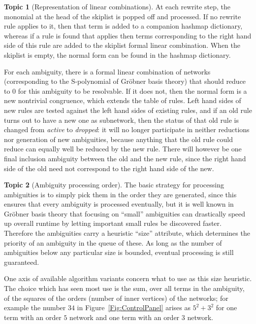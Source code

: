 \documentclass{article}
\theoremstyle{definition}
\newtheorem{topic}{Topic}
\begin{document}
\begin{topic}[Representation of linear combinations]
  At each rewrite step, the monomial at the head of the skiplist is 
  popped off and processed. If no rewrite rule applies to it, then 
  that term is added to a companion hashmap dictionary, whereas if a 
  rule is found that applies then terms corresponding to the right 
  hand side of this rule are added to the skiplist formal linear 
  combination. When the skiplist is empty, the normal form can be 
  found in the hashmap dictionary.
\end{topic}

For each ambiguity, there is a formal linear combination of networks 
(corresponding to the S-polynomial of Gr\"obner basis theory) that 
should reduce to $0$ for this ambiguity to be resolvable. If it does 
not, then the normal form is a new nontrivial congruence, which 
extends the table of rules. Left hand sides of new rules are tested 
against the left hand sides of existing rules, and if an old rule 
turns out to have a new one as subnetwork, then the status of that 
old rule is changed from \emph{active} to \emph{dropped}: it will no 
longer participate in neither reductions nor generation of new 
ambiguities, because anything that the old rule could reduce can 
equally well be reduced by the new rule. There will however be one 
final inclusion ambiguity between the old and the new rule, since the 
right hand side of the old need not correspond to the right hand side 
of the new.

\begin{topic}[Ambiguity processing order]
  The basic strategy for processing ambiguities is to simply pick 
  them in the order they are generated, since this ensures that every 
  ambiguity is processed eventually, but it is well known in 
  Gr\"obner basis theory that focusing on ``small'' ambiguities can 
  drastically speed up overall runtime by letting important small 
  rules be discovered faster. Therefore the ambiguities carry a 
  heuristic ``size'' attribute, which determines the priority of an 
  ambiguity in the queue of these. As long as the number of 
  ambiguities below any particular size is bounded, eventual 
  processing is still guaranteed.
  
  One axis of available algorithm variants concern what to use as 
  this size heuristic. The choice which has seen most use is the sum, 
  over all terms in the ambiguity, of the squares of the orders 
  (number of inner vertices) of the networks; for example the number 
  $34$ in Figure~\ref{Fig:ControlPanel} arises as $5^2 + 3^2$ for one 
  term with an order $5$ network and one term with an order $3$ 
  network.
\end{topic}
\end{document}

